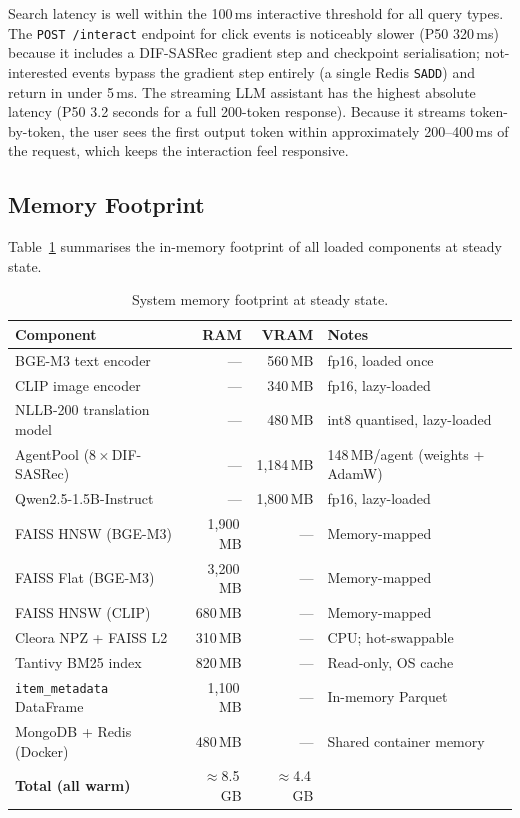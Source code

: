 Search latency is well within the 100\,ms interactive threshold for all query types.
The \texttt{POST /interact} endpoint for click events is noticeably slower (P50 320\,ms) because it includes a DIF-SASRec gradient step and checkpoint serialisation; not-interested events bypass the gradient step entirely (a single Redis \texttt{SADD}) and return in under 5\,ms.
The streaming LLM assistant has the highest absolute latency (P50 3.2 seconds for a full 200-token response). Because it streams token-by-token, the user sees the first output token within approximately 200--400\,ms of the request, which keeps the interaction feel responsive.

\subsection{Memory Footprint}

Table~\ref{tab:memory_footprint} summarises the in-memory footprint of all loaded components at steady state.

\begin{table}[H]
\centering
\caption{System memory footprint at steady state.}
\label{tab:memory_footprint}
\begin{tabular}{p{5.0cm} r r p{4.8cm}}
\hline
\textbf{Component} & \textbf{RAM} & \textbf{VRAM} & \textbf{Notes} \\
\hline
BGE-M3 text encoder          & —           & 560\,MB      & fp16, loaded once \\
CLIP image encoder            & —           & 340\,MB      & fp16, lazy-loaded \\
NLLB-200 translation model    & —           & 480\,MB      & int8 quantised, lazy-loaded \\
AgentPool (8\,$\times$\,DIF-SASRec) & —   & 1{,}184\,MB  & 148\,MB/agent (weights + AdamW) \\
Qwen2.5-1.5B-Instruct        & —           & 1{,}800\,MB  & fp16, lazy-loaded \\
FAISS HNSW (BGE-M3)          & 1{,}900\,MB & —            & Memory-mapped \\
FAISS Flat (BGE-M3)          & 3{,}200\,MB & —            & Memory-mapped \\
FAISS HNSW (CLIP)            & 680\,MB     & —            & Memory-mapped \\
Cleora NPZ + FAISS L2         & 310\,MB     & —            & CPU; hot-swappable \\
Tantivy BM25 index            & 820\,MB     & —            & Read-only, OS cache \\
\texttt{item\_metadata} DataFrame & 1{,}100\,MB & —        & In-memory Parquet \\
MongoDB + Redis (Docker)      & 480\,MB     & —            & Shared container memory \\
\hline
\textbf{Total (all warm)}    & $\approx$8.5\,GB & $\approx$4.4\,GB & \\
\hline
\end{tabular}
\end{table}


